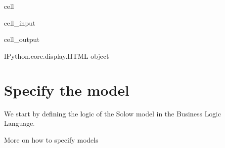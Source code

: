 \documentclass[letterpaper,10pt,english]{jupyterBook}
\begin{document}
\begin{sphinxuseclass}{cell}\begin{sphinxVerbatimInput}

\begin{sphinxuseclass}{cell_input}
\begin{sphinxVerbatim}[commandchars=\\\{\}]
   

   
   
\end{sphinxVerbatim}

\end{sphinxuseclass}\end{sphinxVerbatimInput}
\begin{sphinxVerbatimOutput}

\begin{sphinxuseclass}{cell_output}
\begin{sphinxVerbatim}[commandchars=\\\{\}]
\PYGZlt{}IPython.core.display.HTML object\PYGZgt{}
\end{sphinxVerbatim}

\end{sphinxuseclass}\end{sphinxVerbatimOutput}

\end{sphinxuseclass}

\section{Specify the model}
\label{\detokenize{content/notebooks/intro/Example Solow:specify-the-model}}
\sphinxAtStartPar
We start by defining the logic of the Solow model in the Business Logic Language.

\begin{sphinxShadowBox}

\sphinxAtStartPar
More on how to specify models {\hyperref[\detokenize{content/notebooks/intro/model specification::doc}]{}}
\end{sphinxShadowBox}
\end{document}
